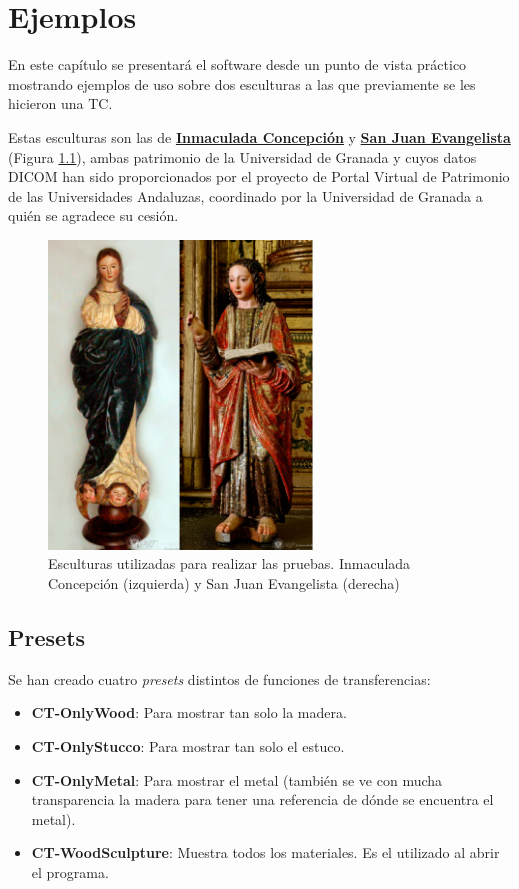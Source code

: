 \chapter{Ejemplos}

En este capítulo se presentará el software desde un punto de vista práctico mostrando ejemplos de uso sobre dos esculturas a las que previamente se les hicieron una TC.

Estas esculturas son las de \href{http://patrimonio3d.ugr.es/index.php/granada/escultura/item/18-inmaculada-concepcion}{\textbf{Inmaculada Concepción}} y \href{http://patrimonio3d.ugr.es/index.php/granada/escultura/item/6-san-juan-evangelista}{\textbf{San Juan Evangelista}} (Figura \ref{fig:figuras_reales}), ambas patrimonio de la Universidad de Granada y cuyos datos DICOM han sido proporcionados por el proyecto de Portal Virtual de Patrimonio de las Universidades Andaluzas, coordinado por la Universidad de Granada a quién se agradece su cesión.

\begin{figure}[H]
	\centering
	\includegraphics[width=7cm]{imagenes/figuras_reales}
	\caption{Esculturas utilizadas para realizar las pruebas. Inmaculada Concepción (izquierda) y San Juan Evangelista (derecha)}
	\label{fig:figuras_reales}
\end{figure}

\section{Presets}

Se han creado cuatro \textit{presets} distintos de funciones de transferencias:

\begin{itemize}
	\item \textbf{CT-OnlyWood}: Para mostrar tan solo la madera.
	\item \textbf{CT-OnlyStucco}: Para mostrar tan solo el estuco.
	\item \textbf{CT-OnlyMetal}: Para mostrar el metal (también se ve con mucha transparencia la madera para tener una referencia de dónde se encuentra el metal).
	\item \textbf{CT-WoodSculpture}: Muestra todos los materiales. Es el utilizado al abrir el programa.
\end{itemize}

